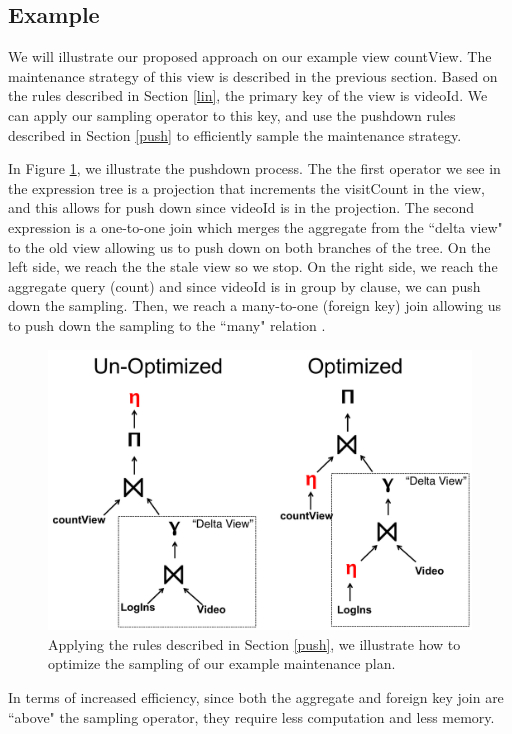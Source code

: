 \subsection{Example}
We will illustrate our proposed approach on our example view \textsf{countView}.
The maintenance strategy of this view is described in the previous section.
Based on the rules described in Section \ref{lin}, the primary key of the view is \textsf{videoId}.
We can apply our sampling operator to this key, and use the pushdown rules described in Section \ref{push} to efficiently sample the maintenance strategy.

In Figure \ref{exexpr2}, we illustrate the pushdown process.
The the first operator we see in the expression tree is a projection that increments the \textsf{visitCount} in the view, and this allows
for push down since \textsf{videoId} is in the projection.
The second expression is a one-to-one join which merges the aggregate from the ``delta view" to the old view allowing us to push down on both branches of the tree.
On the left side, we reach the the stale view so we stop.
On the right side, we reach the aggregate query (count) and since \textsf{videoId} is in group by clause, we can push down the sampling.
Then, we reach a many-to-one (foreign key) join allowing us to push down the sampling to the ``many" relation .

\begin{figure}[t] \vspace{-2em}
\centering
 \includegraphics[scale=0.20]{figs/example_expression_tree_2.pdf} \vspace{-.25em}
 \caption{Applying the rules described in Section \ref{push}, we illustrate how to optimize the sampling of our example maintenance plan. \label{exexpr2}}\vspace{-1.75em}
\end{figure}

In terms of increased efficiency, since both the aggregate and foreign key join are ``above" the sampling operator, they require less computation and less memory.


